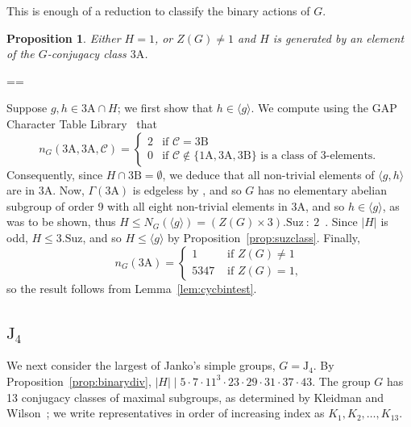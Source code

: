 \documentclass[11pt, a4paper]{amsart}
\makeatletter
\newcommand\C{\mathcal{C}}
\def\cn{\mathord{{\!\:{:}\:\!}}}
\newtheorem{prop}[thm]{Proposition}
\renewcommand{\proofname}{Proof}
\renewenvironment{proof}[1][\proofname]{\par
  \pushQED{\qed}  \normalfont \partopsep=\z@skip \topsep=\z@skip
  \trivlist
  \item[\hskip\labelsep
        \scshape
    #1\@addpunct{.}]\ignorespaces
}{  \popQED\endtrivlist\@endpefalse
}
\makeatother
\begin{document}
This is enough of a reduction to classify the binary actions of $G$.
\begin{prop}
    Either $H=1$, or $Z(G)\ne 1$ and $H$ is generated by an element of the $G$-conjugacy class $\mathrm{3A}$.
\end{prop}
\begin{proof}
    Suppose $g,h\in\mathrm{3A}\cap H$; we first show that $h\in\langle g\rangle$. We compute using the {\sf GAP} Character Table Library~\cite{CTblLib1.3.11} that $$n_G(\mathrm{3A},\mathrm{3A},\mathcal{C})=\begin{cases}
        2&\text{if $\C=\mathrm{3B}$}
        \\0&\text{if $\C\not\in\{\mathrm{1A},\mathrm{3A},\mathrm{3B}\}$ is a class of $3$-elements.}
    \end{cases}$$
    Consequently, since $H\cap\mathrm{3B}=\emptyset$, we deduce that all non-trivial elements of $\langle g,h\rangle$ are in $\mathrm{3A}$. Now, $\Gamma(\mathrm{3A})$ is edgeless by \cite[Proposition 3.1]{CDP}, and so $G$ has no elementary abelian subgroup of order 9 with all eight non-trivial elements in $\mathrm{3A}$, and so $h\in \langle g\rangle$, as was to be shown, thus $H\leq N_G(\langle g\rangle)=(Z(G)\times3).\mathrm{Suz}\cn2$~\cite{atlas}. Since $|H|$ is odd, $H\leq 3.\mathrm{Suz}$, and so $H\leq \langle g\rangle$ by Proposition~\ref{prop:suzclass}. Finally, $$n_G(\mathrm{3A})=\begin{cases}
        1&\text{ if $Z(G)\ne 1$}\\
        5347&\text{ if $Z(G)=1$},
    \end{cases}$$
    so the result follows from Lemma~\ref{lem:cycbintest}.
    \end{proof}
\subsection{$\mathrm{J}_4$} We next consider the largest of Janko's simple groups, $G=\mathrm{J}_4$. By Proposition~\ref{prop:binarydiv}, $|H|\mid 5\cdot7\cdot11^3\cdot23\cdot29\cdot31\cdot37\cdot43.$ The group $G$ has 13 conjugacy classes of maximal subgroups, as determined by Kleidman and Wilson~\cite{KW88}; we write representatives in order of increasing index as $K_1,K_2,\dots,K_{13}$.
\end{document}
